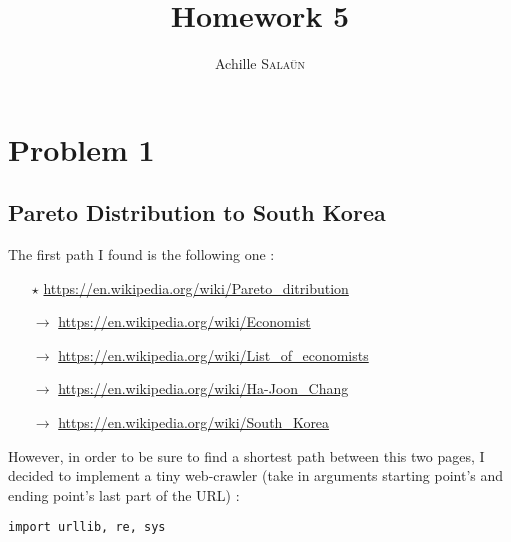 \documentclass[a4paper]{report}
\title{Homework 5}
\author{Achille \textsc{Sala\"{u}n}}
\begin{document}
\maketitle

\section*{Problem 1}
\subsection*{Pareto Distribution to South Korea}

The first path I found is the following one : 
\medbreak
\begin{itemize}
\item[$\star$] \url{https://en.wikipedia.org/wiki/Pareto_ditribution}
\item[$\rightarrow$] \url{https://en.wikipedia.org/wiki/Economist}
\item[$\rightarrow$] \url{https://en.wikipedia.org/wiki/List_of_economists}
\item[$\rightarrow$] \url{https://en.wikipedia.org/wiki/Ha-Joon_Chang}
\item[$\rightarrow$] \url{https://en.wikipedia.org/wiki/South_Korea}
\end{itemize}
\medbreak
However, in order to be sure to find a shortest path between this two pages, I decided to implement a tiny web-crawler (take in arguments starting point's and ending point's last part of the URL) :
\medbreak

\noindent \texttt{import urllib, re, sys}\\
\end{document}
